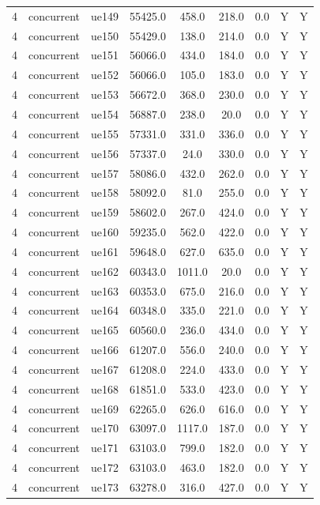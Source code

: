 \begin{table}[ht]
\begin{tabular}{|c|c|c|c|c|c|c|c|c|}
4 & concurrent & ue149 & 55425.0 & 458.0 & 218.0 & 0.0 & Y & Y \\
4 & concurrent & ue150 & 55429.0 & 138.0 & 214.0 & 0.0 & Y & Y \\
4 & concurrent & ue151 & 56066.0 & 434.0 & 184.0 & 0.0 & Y & Y \\
4 & concurrent & ue152 & 56066.0 & 105.0 & 183.0 & 0.0 & Y & Y \\
4 & concurrent & ue153 & 56672.0 & 368.0 & 230.0 & 0.0 & Y & Y \\
4 & concurrent & ue154 & 56887.0 & 238.0 & 20.0 & 0.0 & Y & Y \\
4 & concurrent & ue155 & 57331.0 & 331.0 & 336.0 & 0.0 & Y & Y \\
4 & concurrent & ue156 & 57337.0 & 24.0 & 330.0 & 0.0 & Y & Y \\
4 & concurrent & ue157 & 58086.0 & 432.0 & 262.0 & 0.0 & Y & Y \\
4 & concurrent & ue158 & 58092.0 & 81.0 & 255.0 & 0.0 & Y & Y \\
4 & concurrent & ue159 & 58602.0 & 267.0 & 424.0 & 0.0 & Y & Y \\
4 & concurrent & ue160 & 59235.0 & 562.0 & 422.0 & 0.0 & Y & Y \\
4 & concurrent & ue161 & 59648.0 & 627.0 & 635.0 & 0.0 & Y & Y \\
4 & concurrent & ue162 & 60343.0 & 1011.0 & 20.0 & 0.0 & Y & Y \\
4 & concurrent & ue163 & 60353.0 & 675.0 & 216.0 & 0.0 & Y & Y \\
4 & concurrent & ue164 & 60348.0 & 335.0 & 221.0 & 0.0 & Y & Y \\
4 & concurrent & ue165 & 60560.0 & 236.0 & 434.0 & 0.0 & Y & Y \\
4 & concurrent & ue166 & 61207.0 & 556.0 & 240.0 & 0.0 & Y & Y \\
4 & concurrent & ue167 & 61208.0 & 224.0 & 433.0 & 0.0 & Y & Y \\
4 & concurrent & ue168 & 61851.0 & 533.0 & 423.0 & 0.0 & Y & Y \\
4 & concurrent & ue169 & 62265.0 & 626.0 & 616.0 & 0.0 & Y & Y \\
4 & concurrent & ue170 & 63097.0 & 1117.0 & 187.0 & 0.0 & Y & Y \\
4 & concurrent & ue171 & 63103.0 & 799.0 & 182.0 & 0.0 & Y & Y \\
4 & concurrent & ue172 & 63103.0 & 463.0 & 182.0 & 0.0 & Y & Y \\
4 & concurrent & ue173 & 63278.0 & 316.0 & 427.0 & 0.0 & Y & Y \\

\end{tabular}
\end{table}
